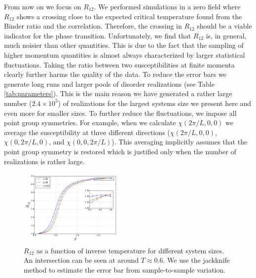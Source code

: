\documentclass[aps,prb,twocolumn,showpacs,superscriptaddress]{revtex4}
\begin{document}
From now on we focus on $R_{12}$. We performed simulations in a zero field
where $R_{12}$ shows a crossing close to the expected critical temperature found from
the Binder ratio and the correlation. Therefore, the crossing in $R_{12}$ should 
be a viable indicator for the phase transition. Unfortunately, we find that $R_{12}$ is, 
in general, much noisier than other quantities. This is due to the fact that the sampling 
of higher momentum quantities is almost always characterized by larger statistical 
fluctuations. Taking the ratio between two susceptibilities at finite momenta clearly further
harms the quality of the data. To reduce the error bars we generate long runs and larger 
pools of disorder realizations (see Table \ref{tab:parameters}). This is the main reason we have generated a rather large number ($2.4 \times 10^5$) of realizations 
for the largest systems size we present here and even more for smaller sizes. To further reduce the 
fluctuations, we impose all point group symmetries. For example, when we calculate 
$\chi(2\pi/L,0,0)$ we average the susceptibility at three different directions 
($\chi(2\pi/L,0,0)$, $\chi(0,2\pi/L,0)$, and $\chi(0,0,2\pi/L)$). This averaging implicitly assumes 
that the point group symmetry is restored which is justified only when the number of realizations
is rather large. 
 
\begin{figure}[ht]
\includegraphics[width=0.45\textwidth]{img/r12.pdf}%
\caption{\label{fig:r12} $R_{12}$ as a function of inverse temperature for different system sizes. 
An intersection can be seen at around $T \approx 0.6$. We use the jackknife method to estimate 
the error bar from sample-to-sample variation.  
}
\end{figure}
\end{document}
